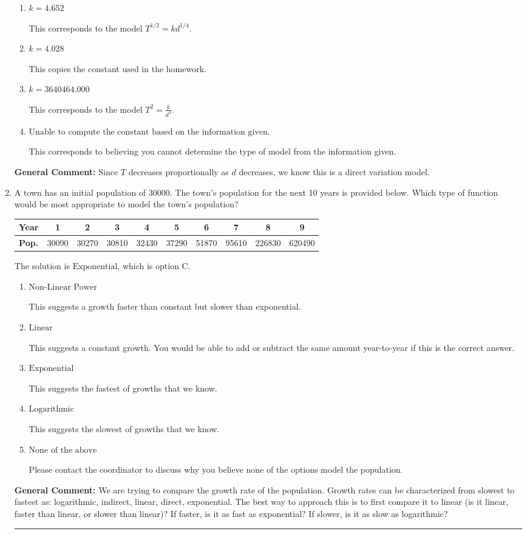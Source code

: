 \documentclass{extbook}[14pt]
\newcommand{\litem}[1]{\item #1

\rule{\textwidth}{0.4pt}}
\begin{document}
\begin{enumerate}
{\begin{enumerate}[label=\Alph*.]
* This is the correct option corresponding to the model $T^{2} = k d^{4}$.
\item \( k = 4.652 \)

This corresponds to the model $T^{1/2} = k d^{1/4}$.
\item \( k = 4.028 \)

This copies the constant used in the homework.
\item \( k = 3640464.000 \)

This corresponds to the model $T^{2} = \frac{k}{d^{4}}$.
\item \( \text{Unable to compute the constant based on the information given.} \)

This corresponds to believing you cannot determine the type of model from the information given.
\end{enumerate}

\textbf{General Comment:} Since $T$ decreases proportionally as $d$ decreases, we know this is a direct variation model.
}
\litem{
A town has an initial population of 30000. The town's population for the next 10 years is provided below. Which type of function would be most appropriate to model the town's population?



\begin{tabular}{c|c|c|c|c|c|c|c|c|c}
\textbf{Year} & 1 & 2 & 3 & 4 & 5 & 6 & 7 & 8 & 9 \tabularnewline
\hline
\textbf{Pop.} & 30090 & 30270 & 30810 & 32430 & 37290 & 51870 & 95610 & 226830 & 620490
\end{tabular} 

The solution is \( \text{Exponential} \), which is option C.\begin{enumerate}[label=\Alph*.]
\item \( \text{Non-Linear Power} \)

This suggests a growth faster than constant but slower than exponential.
\item \( \text{Linear} \)

This suggests a constant growth. You would be able to add or subtract the same amount year-to-year if this is the correct answer.
\item \( \text{Exponential} \)

This suggests the fastest of growths that we know.
\item \( \text{Logarithmic} \)

This suggests the slowest of growths that we know.
\item \( \text{None of the above} \)

Please contact the coordinator to discuss why you believe none of the options model the population.
\end{enumerate}

\textbf{General Comment:} We are trying to compare the growth rate of the population. Growth rates can be characterized from slowest to fastest as: logarithmic, indirect, linear, direct, exponential. The best way to approach this is to first compare it to linear (is it linear, faster than linear, or slower than linear)? If faster, is it as fast as exponential? If slower, is it as slow as logarithmic?
}
\end{enumerate}
\end{document}
